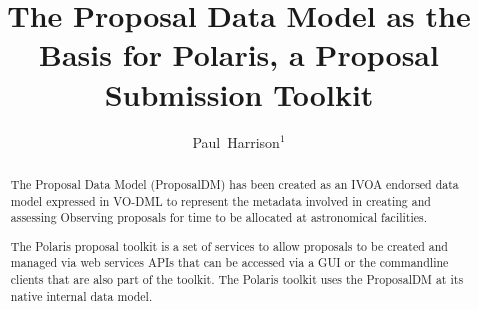 \documentclass[11pt,twoside]{article}
\begin{document}
\title{The Proposal Data Model as the Basis for Polaris, a Proposal Submission Toolkit}

\author{Paul~Harrison$^1$}






\begin{abstract}
The Proposal Data Model (ProposalDM) has been created as an IVOA endorsed data model expressed in VO-DML to represent the metadata involved in creating and assessing
    Observing proposals for time to be allocated at astronomical facilities.

    The Polaris proposal toolkit is a set of services to allow proposals to be created and managed via web services APIs that can be accessed via a GUI or the
    commandline clients that are also part of the toolkit.
    The Polaris toolkit uses the ProposalDM at its native internal data model.
\end{abstract}
\end{document}
